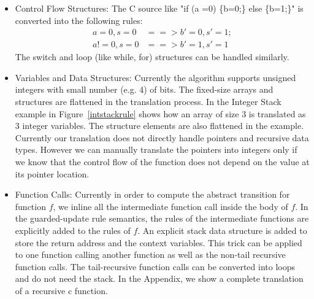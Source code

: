 \documentclass{llncs}
\begin{document}
\begin{itemize}
\item Control Flow Structures: The C source like "if (a =0) \{b=0;\} else \{b=1;\}" is converted into the following rules:
\begin{align*}
  a = 0 , s = 0 &==> b'=0 , s'=1;\\
  a != 0 , s= 0 &==> b'=1, s' = 1 
\end{align*}
The switch and  loop (like while, for) structures can be handled similarly.

\item Variables and Data Structures: Currently the algorithm supports 
unsigned integers with small number (e.g. 4) of bits.
The fixed-size arrays and structures are flattened in the translation process. In the Integer Stack example in Figure~\ref{intstackrule} shows how an array of size $3$ is translated as 3 integer variables.
The structure elements are also flattened in the example. 
Currently our translation does not directly handle pointers and recursive data types. 
However we can manually translate the pointers into integers only if we know that the control flow of the function does not depend on the value at its pointer location.  

\item Function Calls: Currently in order to compute the abstract transition for function $f$, we inline all 
the intermediate function call inside the body of $f$.
In the guarded-update rule semantics, the rules of the intermediate functions are explicitly added
to the rules of $f$.
An explicit stack data structure is added to store the return address and the context variables.
This trick can be applied to one function calling another function as well as the  non-tail
recursive function calls.
The tail-recursive function calls can be converted into loops and do not need the stack.
In the Appendix, we show a complete translation of a recursive c function.
\end{itemize}
\end{document}
